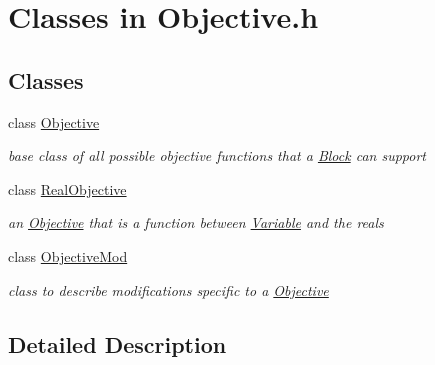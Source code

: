 \hypertarget{group___objective___c_l_a_s_s_e_s}{}\section{Classes in Objective.\+h}
\label{group___objective___c_l_a_s_s_e_s}
\subsection*{Classes}
\begin{DoxyCompactItemize}
\item 
class \mbox{\hyperlink{class_s_m_spp__di__unipi__it_1_1_objective}{Objective}}
\begin{DoxyCompactList}\small\item\em base class of all possible objective functions that a \mbox{\hyperlink{class_s_m_spp__di__unipi__it_1_1_block}{Block}} can support \end{DoxyCompactList}\item 
class \mbox{\hyperlink{class_s_m_spp__di__unipi__it_1_1_real_objective}{Real\+Objective}}
\begin{DoxyCompactList}\small\item\em an \mbox{\hyperlink{class_s_m_spp__di__unipi__it_1_1_objective}{Objective}} that is a function between \mbox{\hyperlink{class_s_m_spp__di__unipi__it_1_1_variable}{Variable}} and the reals \end{DoxyCompactList}\item 
class \mbox{\hyperlink{class_s_m_spp__di__unipi__it_1_1_objective_mod}{Objective\+Mod}}
\begin{DoxyCompactList}\small\item\em class to describe modifications specific to a \mbox{\hyperlink{class_s_m_spp__di__unipi__it_1_1_objective}{Objective}} \end{DoxyCompactList}\end{DoxyCompactItemize}


\subsection{Detailed Description}

